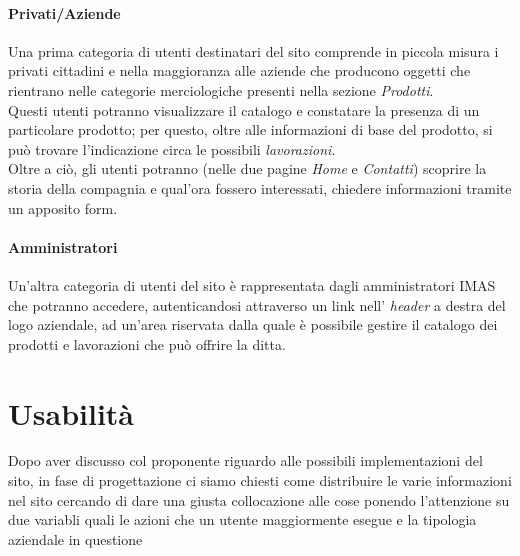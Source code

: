 \documentclass[11pt]{article}
\begin{document}
\paragraph{Privati/Aziende}
Una prima categoria di utenti destinatari del sito comprende in piccola misura i privati cittadini e nella maggioranza alle aziende che producono oggetti che rientrano nelle categorie merciologiche presenti nella sezione  \textit{Prodotti}.\\
Questi utenti potranno visualizzare il catalogo e constatare la presenza di un particolare prodotto; per questo, oltre alle informazioni di base del prodotto, si può trovare l'indicazione circa le possibili \textit{lavorazioni}.\\
Oltre a ciò, gli utenti potranno (nelle due pagine \textit{Home} e \textit{Contatti}) scoprire la storia della compagnia e qual'ora fossero interessati, chiedere informazioni tramite un apposito form.

\paragraph{Amministratori}
Un'altra categoria di utenti del sito è rappresentata dagli amministratori IMAS che potranno accedere, autenticandosi attraverso un link nell' \textit{header} a destra del logo aziendale, ad un'area riservata dalla quale è possibile gestire il catalogo dei prodotti e lavorazioni che può offrire la ditta.

\newpage

\section{Usabilità}

Dopo aver discusso col proponente riguardo alle possibili implementazioni del sito, in fase di progettazione ci siamo chiesti come distribuire le varie informazioni nel sito cercando di dare una giusta collocazione alle cose ponendo l'attenzione su due variabli quali le azioni che un utente maggiormente esegue e la tipologia aziendale in questione
\end{document}
